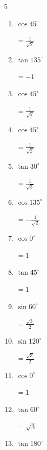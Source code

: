 \begin{multicols}{5}
\begin{enumerate}
        $\displaystyle =0$

  \item $\displaystyle \cos{45^\circ}$

        $\displaystyle =\frac{1}{\sqrt{2}}$

  \item $\displaystyle \tan{135^\circ}$

        $\displaystyle =-1$

  \item $\displaystyle \cos{45^\circ}$

        $\displaystyle =\frac{1}{\sqrt{2}}$

  \item $\displaystyle \cos{45^\circ}$

        $\displaystyle =\frac{1}{\sqrt{2}}$

  \item $\displaystyle \tan{30^\circ}$

        $\displaystyle =\frac{1}{\sqrt{3}}$

  \item $\displaystyle \cos{135^\circ}$

        $\displaystyle =-\frac{1}{\sqrt{2}}$

  \item $\displaystyle \cos{0^\circ}$

        $\displaystyle =1$

  \item $\displaystyle \tan{45^\circ}$

        $\displaystyle =1$

  \item $\displaystyle \sin{60^\circ}$

        $\displaystyle =\frac{\sqrt{3}}{2}$

\columnbreak %

  \item $\displaystyle \sin{120^\circ}$

        $\displaystyle =\frac{\sqrt{3}}{2}$

  \item $\displaystyle \cos{0^\circ}$

        $\displaystyle =1$

  \item $\displaystyle \tan{60^\circ}$

        $\displaystyle =\sqrt{3}$

  \item $\displaystyle \tan{180^\circ}$


\end{enumerate}
\end{multicols}
